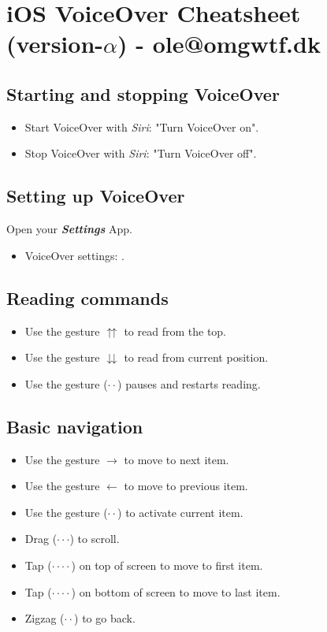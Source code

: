 \documentclass[a4paper, landscape, 10pt]{scrartcl}
\begin{document}
\thispagestyle{empty}

\section*{iOS VoiceOver Cheatsheet (version-$\alpha$) - ole@omgwtf.dk}

\hrulefill{}

\begin{multicols}{2}

\subsection*{Starting and stopping VoiceOver}
\begin{itemize}
\item{Start VoiceOver with \emph{Siri}: "Turn VoiceOver on".}
\item{Stop VoiceOver with \emph{Siri}: "Turn VoiceOver off".}
\end{itemize}

\subsection*{Setting up VoiceOver}
Open your \textbf{\textit{Settings}} App.
\begin{itemize}
\item{VoiceOver settings: .}
\end{itemize}

\subsection*{Reading commands}
\begin{itemize}
\item{Use the gesture $\upuparrows$ to read from the top.}
\item{Use the gesture $\downdownarrows$ to read from current position.}
\item{ Use the gesture ($\cdot\cdot$) pauses and restarts reading.}
\end{itemize}

\subsection*{Basic navigation}
\begin{itemize}
\item{Use the gesture $\rightarrow$ to move to next item.}
\item{Use the gesture $\leftarrow$ to move to previous item.}
\item{Use the gesture ($\cdot\cdot$) to activate current item.}
\item{Drag ($\cdot\cdot\cdot$) to scroll.}
\item{Tap ($\cdot\cdot\cdot\cdot$) on top of screen to move to first item.}
\item{Tap ($\cdot\cdot\cdot\cdot$) on bottom of screen to move to last item.}
\item{Zigzag ($\cdot\cdot$) to go back.}
\end{itemize}


\end{multicols}
\end{document}
